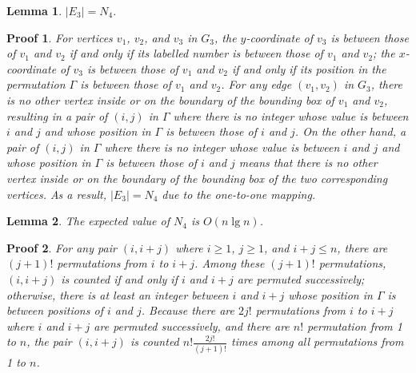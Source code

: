 \documentclass[]{article}
\newtheorem{Lemma}{Lemma}
\newtheorem{Proof}{Proof}
\begin{document}
\begin{qunlist}
{{\begin{Lemma}\label{lemma:e3-n4}
$|E_3|=N_4$.
\end{Lemma}

\begin{Proof}
For vertices $v_1$, $v_2$, and $v_3$ in $G_3$, the $y$-coordinate of $v_3$ is between those of $v_1$ and $v_2$ if and only if its labelled number is between those of $v_1$ and $v_2$; the $x$-coordinate of $v_3$ is between those of $v_1$ and $v_2$ if and only if its position in the permutation $\Gamma$ is between those of $v_1$ and $v_2$. For any edge $(v_1,v_2)$ in $G_3$, there is no other vertex inside or on the boundary of the bounding box of $v_1$ and $v_2$, resulting in a pair of $(i,j)$ in $\Gamma$ where there is no integer whose value is between $i$ and $j$ and whose position in $\Gamma$ is between those of $i$ and $j$. On the other hand, a pair of $(i,j)$ in $\Gamma$ where there is no integer whose value is between $i$ and $j$ and whose position in $\Gamma$ is between those of $i$ and $j$ means that there is no other vertex inside or on the boundary of the bounding box of the two corresponding vertices. As a result, $|E_3|=N_4$ due to the one-to-one mapping.
\end{Proof}

\begin{Lemma}\label{lemma:n4}
The expected value of $N_4$ is $O(n\lg n)$.
\end{Lemma}

\begin{Proof}
For any pair $(i,i+j)$ where $i\geq 1$, $j\geq 1$, and $i+j\leq n$, there are $(j+1)!$ permutations from $i$ to $i+j$. Among these $(j+1)!$ permutations, $(i,i+j)$ is counted if and only if $i$ and $i+j$ are permuted successively; otherwise, there is at least an integer between $i$ and $i+j$ whose position in $\Gamma$ is between positions of $i$ and $j$. Because there are $2j!$ permutations from $i$ to $i+j$ where $i$ and $i+j$ are permuted successively, and there are $n!$ permutation from 1 to $n$, the pair $(i,i+j)$ is counted $n!\frac{2j!}{(j+1)!}$ times among all permutations from 1 to $n$.


\end{Proof}}}
\end{qunlist}
\end{document}
